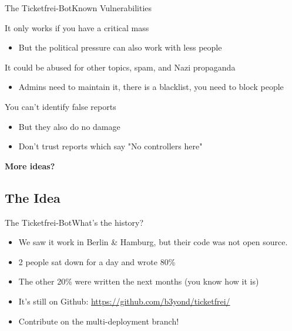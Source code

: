 \documentclass[10pt]{beamer}
\begin{document}
{\begin{frame}{The Ticketfrei-Bot}{Known Vulnerabilities}
\begin{block}{It only works if you have a critical mass}
  \begin{itemize}
    \item But the political pressure can also work with less people
  \end{itemize}
\end{block}

\begin{block}{It could be abused for other topics, spam, and Nazi propaganda}
  \begin{itemize}
    \item Admins need to maintain it, there is a blacklist, you need to block people
  \end{itemize}
\end{block}

\begin{block}{You can't identify false reports}
  \begin{itemize}
    \item But they also do no damage
    \item Don't trust reports which say "No controllers here"
  \end{itemize}
\end{block}

\textbf{More ideas?}

\end{frame}

\subsection{The Idea}
\begin{frame}{The Ticketfrei-Bot}{What's the history?}

\begin{itemize}
    \item We saw it work in Berlin \& Hamburg, but their code was not open source.
    \item 2 people sat down for a day and wrote 80\%
    \item The other 20\% were written the next months (you know how it is)
    \item It's still on Github: \url{https://github.com/b3yond/ticketfrei/}
    \item Contribute on the multi-deployment branch!
\end{itemize}
    

\end{frame}}
\end{document}

